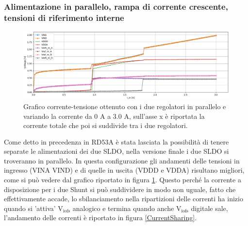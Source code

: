 % 
%

\subsubsection{Alimentazione in parallelo, rampa di corrente crescente, tensioni di riferimento interne} 
\begin{figure}[h]
\centering
\includegraphics[scale=.3]{Immagini/PUI}
\caption{Grafico corrente-tensione ottenuto con i due regolatori in parallelo e variando la corrente da 0 A a 3.0 A, sull'asse x è riportata la corrente totale che poi si suddivide tra i due regolatori.}
\label{PUI}
\end{figure}
Come detto in precedenza in RD53A è stata lasciata la possibilità di tenere separate le alimentazioni dei due SLDO, nella versione finale i due SLDO si troveranno in parallelo. 
In questa configurazione gli andamenti delle tensioni in ingresso (VINA VIND) e di quelle in uscita (VDDD e VDDA) risultano migliori, come si può vedere dal grafico riportato in figura \ref{PUI}. 
Questo perché la corrente a disposizione per i due Shunt si può suddividere in modo non uguale, fatto che effettivamente accade, lo sbilanciamento nella ripartizioni delle correnti ha inizio quando si 'attiva' $\mathrm{V_{iofs}}$ analogico e termina quando anche $\mathrm{V_{iofs}}$  digitale sale, l'andamento delle correnti è riportato in figura \ref{CurrentSharing}.
% 
%

